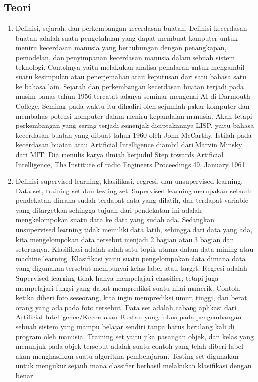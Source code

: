 \subsection{Teori}
\begin{enumerate}
\item Definisi, sejarah, dan perkembangan kecerdasan buatan.
\subitem Definisi kecerdasan buatan adalah suatu pengetahuan yang dapat membuat komputer untuk meniru kecerdasan manusia yang berhubungan dengan penangkapan, pemodelan, dan penyimpanan kecerdasan manusia dalam sebuah sistem teknologi. Contohnya yaitu melakukan analisa penalaran untuk mengambil suatu kesimpulan atau penerjemahan atau keputusan dari satu bahasa satu ke bahasa lain.
\subitem Sejarah dan perkembangan kecerdasan buatan terjadi pada musim panas tahun 1956 tercatat adanya seminar mengenai AI di Darmouth College. Seminar pada waktu itu dihadiri oleh sejumlah pakar komputer dan membahas potensi komputer dalam meniru kepandaian manusia. Akan tetapi perkembangan yang sering terjadi semenjak diciptakannya LISP, yaitu bahasa kecerdasan buatan yang dibuat tahun 1960 oleh John McCarthy. Istilah pada kecerdasan buatan atau Artificial Intelligence diambil dari Marvin Minsky dari MIT. Dia menulis karya ilmiah berjudul Step towards Artificial Intelligence, The Institute of radio Engineers Proceedings 49, January 1961\cite{baraja2008kecerdasan}. 
\item  Definisi supervised learning, klasifikasi, regresi, dan unsupervised learning. Data set, training set dan testing set. 
\subitem Supervised learning merupakan sebuah pendekatan dimana sudah terdapat data yang dilatih, dan terdapat variable yang ditargetkan sehingga tujuan dari pendekatan ini adalah mengkelompokan suatu data ke data yang sudah ada. Sedangkan unsupervised learning tidak memiliki data latih, sehingga dari data yang ada, kita mengelompokan data tersebut menjadi 2 bagian atau 3 bagian dan seterusnya.
\subitem Klasifikasi adalah salah satu topik utama dalam data mining atau machine learning. Klasifikasi yaitu suatu pengelompokan data dimana data yang digunakan tersebut mempunyai kelas label atau target.
\subitem Regresi adalah Supervised learning tidak hanya mempelajari classifier, tetapi juga mempelajari fungsi yang dapat memprediksi suatu nilai numerik. Contoh, ketika diberi foto seseorang, kita ingin memprediksi umur, tinggi, dan berat orang yang ada pada foto tersebut.
\subitem Data set adalah cabang aplikasi dari Artificial Intelligence/Kecerdasan Buatan yang fokus pada pengembangan sebuah sistem yang mampu belajar sendiri tanpa harus berulang kali di program oleh manusia.
\subitem Training set yaitu jika pasangan objek, dan kelas yang menunjuk pada objek tersebut adalah suatu contoh yang telah diberi label akan menghasilkan suatu algoritma pembelajaran.
\subitem Testing set digunakan untuk mengukur sejauh mana classifier berhasil melakukan klasifikasi dengan benar\cite{zhu2009introduction}.
\end{enumerate}
